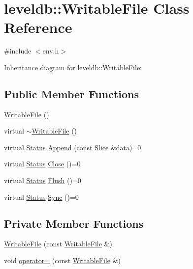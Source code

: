 \hypertarget{classleveldb_1_1_writable_file}{\section{leveldb\-:\-:Writable\-File Class Reference}
\label{classleveldb_1_1_writable_file}
}


{\ttfamily \#include $<$env.\-h$>$}



Inheritance diagram for leveldb\-:\-:Writable\-File\-:
\subsection*{Public Member Functions}
\begin{DoxyCompactItemize}
\item 
\hyperlink{classleveldb_1_1_writable_file_a48e7bcecb75e0339f0dafedb41c058ee}{Writable\-File} ()
\item 
virtual \hyperlink{classleveldb_1_1_writable_file_a6a2f4698544f04288fbee6ef354dd71d}{$\sim$\-Writable\-File} ()
\item 
virtual \hyperlink{classleveldb_1_1_status}{Status} \hyperlink{classleveldb_1_1_writable_file_a53b41841d9577d28f65d4d90e1660de8}{Append} (const \hyperlink{classleveldb_1_1_slice}{Slice} \&data)=0
\item 
virtual \hyperlink{classleveldb_1_1_status}{Status} \hyperlink{classleveldb_1_1_writable_file_a2efbf9c02a26028b5002df73b4393915}{Close} ()=0
\item 
virtual \hyperlink{classleveldb_1_1_status}{Status} \hyperlink{classleveldb_1_1_writable_file_ab95759ad32f6a05b0ee4266969fa265e}{Flush} ()=0
\item 
virtual \hyperlink{classleveldb_1_1_status}{Status} \hyperlink{classleveldb_1_1_writable_file_a2d2dcef02a2c9e71f3d39125bcd5a606}{Sync} ()=0
\end{DoxyCompactItemize}
\subsection*{Private Member Functions}
\begin{DoxyCompactItemize}
\item 
\hyperlink{classleveldb_1_1_writable_file_a3ef8319de3675e06b3dc25e263ab7f0a}{Writable\-File} (const \hyperlink{classleveldb_1_1_writable_file}{Writable\-File} \&)
\item 
void \hyperlink{classleveldb_1_1_writable_file_a8fb35a929c018260e2302d6cf13ce38d}{operator=} (const \hyperlink{classleveldb_1_1_writable_file}{Writable\-File} \&)
\end{DoxyCompactItemize}


